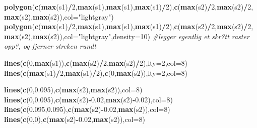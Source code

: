 \documentclass[]{article}
\newenvironment{Shaded}{\begin{snugshade}}{\end{snugshade}}
\newcommand{\CommentTok}[1]{\textcolor[rgb]{0.56,0.35,0.01}{\textit{#1}}}
\newcommand{\DataTypeTok}[1]{\textcolor[rgb]{0.13,0.29,0.53}{#1}}
\newcommand{\DecValTok}[1]{\textcolor[rgb]{0.00,0.00,0.81}{#1}}
\newcommand{\FloatTok}[1]{\textcolor[rgb]{0.00,0.00,0.81}{#1}}
\newcommand{\KeywordTok}[1]{\textcolor[rgb]{0.13,0.29,0.53}{\textbf{#1}}}
\newcommand{\NormalTok}[1]{#1}
\newcommand{\OperatorTok}[1]{\textcolor[rgb]{0.81,0.36,0.00}{\textbf{#1}}}
\newcommand{\StringTok}[1]{\textcolor[rgb]{0.31,0.60,0.02}{#1}}
\begin{document}
\begin{Shaded}
\begin{Highlighting}[]
\KeywordTok{polygon}\NormalTok{(}\KeywordTok{c}\NormalTok{(}\KeywordTok{max}\NormalTok{(s1)}\OperatorTok{/}\DecValTok{2}\NormalTok{,}\KeywordTok{max}\NormalTok{(s1),}\KeywordTok{max}\NormalTok{(s1),}\KeywordTok{max}\NormalTok{(s1)}\OperatorTok{/}\DecValTok{2}\NormalTok{),}\KeywordTok{c}\NormalTok{(}\KeywordTok{max}\NormalTok{(s2)}\OperatorTok{/}\DecValTok{2}\NormalTok{,}\KeywordTok{max}\NormalTok{(s2)}\OperatorTok{/}\DecValTok{2}\NormalTok{,}\KeywordTok{max}\NormalTok{(s2),}\KeywordTok{max}\NormalTok{(s2)),}\DataTypeTok{col=}\StringTok{"lightgray"}\NormalTok{)}
\KeywordTok{polygon}\NormalTok{(}\KeywordTok{c}\NormalTok{(}\KeywordTok{max}\NormalTok{(s1)}\OperatorTok{/}\DecValTok{2}\NormalTok{,}\KeywordTok{max}\NormalTok{(s1),}\KeywordTok{max}\NormalTok{(s1),}\KeywordTok{max}\NormalTok{(s1)}\OperatorTok{/}\DecValTok{2}\NormalTok{),}\KeywordTok{c}\NormalTok{(}\KeywordTok{max}\NormalTok{(s2)}\OperatorTok{/}\DecValTok{2}\NormalTok{,}\KeywordTok{max}\NormalTok{(s2)}\OperatorTok{/}\DecValTok{2}\NormalTok{,}\KeywordTok{max}\NormalTok{(s2),}\KeywordTok{max}\NormalTok{(s2)),}\DataTypeTok{col=}\StringTok{"lightgray"}\NormalTok{,}\DataTypeTok{density=}\DecValTok{10}\NormalTok{) }\CommentTok{#legger egentlig et skr?tt raster opp?, og fjerner streken rundt}

\KeywordTok{lines}\NormalTok{(}\KeywordTok{c}\NormalTok{(}\DecValTok{0}\NormalTok{,}\KeywordTok{max}\NormalTok{(s1)),}\KeywordTok{c}\NormalTok{(}\KeywordTok{max}\NormalTok{(s2)}\OperatorTok{/}\DecValTok{2}\NormalTok{,}\KeywordTok{max}\NormalTok{(s2)}\OperatorTok{/}\DecValTok{2}\NormalTok{),}\DataTypeTok{lty=}\DecValTok{2}\NormalTok{,}\DataTypeTok{col=}\DecValTok{8}\NormalTok{)}
\KeywordTok{lines}\NormalTok{(}\KeywordTok{c}\NormalTok{(}\KeywordTok{max}\NormalTok{(s1)}\OperatorTok{/}\DecValTok{2}\NormalTok{,}\KeywordTok{max}\NormalTok{(s1)}\OperatorTok{/}\DecValTok{2}\NormalTok{),}\KeywordTok{c}\NormalTok{(}\DecValTok{0}\NormalTok{,}\KeywordTok{max}\NormalTok{(s2)),}\DataTypeTok{lty=}\DecValTok{2}\NormalTok{,}\DataTypeTok{col=}\DecValTok{8}\NormalTok{)}

\KeywordTok{lines}\NormalTok{(}\KeywordTok{c}\NormalTok{(}\DecValTok{0}\NormalTok{,}\FloatTok{0.095}\NormalTok{),}\KeywordTok{c}\NormalTok{(}\KeywordTok{max}\NormalTok{(s2),}\KeywordTok{max}\NormalTok{(s2)),}\DataTypeTok{col=}\DecValTok{8}\NormalTok{)}
\KeywordTok{lines}\NormalTok{(}\KeywordTok{c}\NormalTok{(}\DecValTok{0}\NormalTok{,}\FloatTok{0.095}\NormalTok{),}\KeywordTok{c}\NormalTok{(}\KeywordTok{max}\NormalTok{(s2)}\OperatorTok{-}\FloatTok{0.02}\NormalTok{,}\KeywordTok{max}\NormalTok{(s2)}\OperatorTok{-}\FloatTok{0.02}\NormalTok{),}\DataTypeTok{col=}\DecValTok{8}\NormalTok{)}
\KeywordTok{lines}\NormalTok{(}\KeywordTok{c}\NormalTok{(}\FloatTok{0.095}\NormalTok{,}\FloatTok{0.095}\NormalTok{),}\KeywordTok{c}\NormalTok{(}\KeywordTok{max}\NormalTok{(s2)}\OperatorTok{-}\FloatTok{0.02}\NormalTok{,}\KeywordTok{max}\NormalTok{(s2)),}\DataTypeTok{col=}\DecValTok{8}\NormalTok{)}
\KeywordTok{lines}\NormalTok{(}\KeywordTok{c}\NormalTok{(}\DecValTok{0}\NormalTok{,}\DecValTok{0}\NormalTok{),}\KeywordTok{c}\NormalTok{(}\KeywordTok{max}\NormalTok{(s2)}\OperatorTok{-}\FloatTok{0.02}\NormalTok{,}\KeywordTok{max}\NormalTok{(s2)),}\DataTypeTok{col=}\DecValTok{8}\NormalTok{)}


\end{Highlighting}
\end{Shaded}
\end{document}
